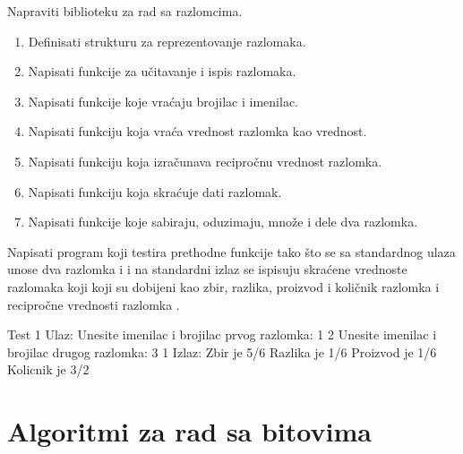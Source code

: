 \begin{Exercise}[label=004] %
Napraviti biblioteku za rad sa razlomcima.

  \begin{enumerate}

  \item Definisati strukturu za reprezentovanje razlomaka.

  \item Napisati funkcije za učitavanje i ispis razlomaka.

  \item Napisati funkcije koje vraćaju brojilac i imenilac.

  \item Napisati funkciju koja vraća vrednost razlomka kao  
    vrednost.

  \item Napisati funkciju koja izračunava recipročnu vrednost
    razlomka.

  \item Napisati funkciju koja skraćuje dati razlomak.

  \item Napisati funkcije koje sabiraju, oduzimaju, množe i dele
    dva razlomka.

  \end{enumerate}

Napisati program koji testira prethodne funkcije tako što se sa standardnog ulaza unose dva razlomka  i  i na standardni izlaz se ispisuju skraćene vrednoste razlomaka koji koji su dobijeni kao zbir, razlika, proizvod i količnik razlomka  i recipročne vrednosti razlomka .

\begin{maxitest}
\begin{test}{Test 1}
Ulaz:   Unesite imenilac i brojilac prvog razlomka: 1 2
        Unesite imenilac i brojilac drugog razlomka: 3 1 
Izlaz:   Zbir je 5/6
         Razlika je 1/6
         Proizvod je 1/6
         Kolicnik je 3/2
\end{test}
\end{maxitest}


\end{Exercise}

\section{Algoritmi za rad sa bitovima}

